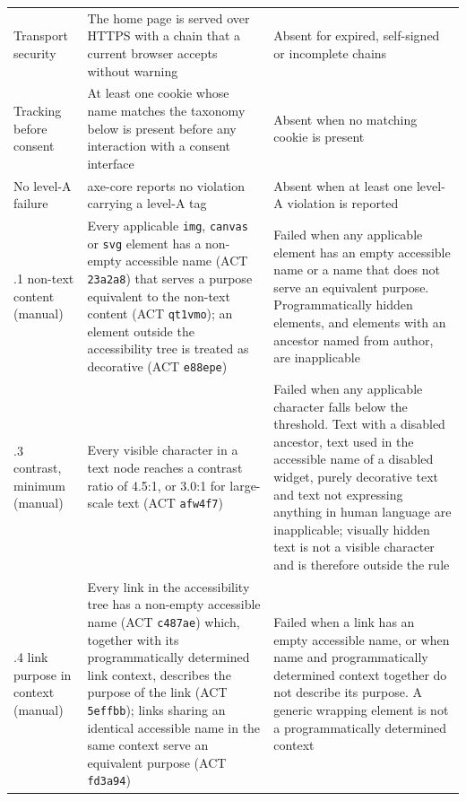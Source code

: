 \documentclass[]{interact}
\begin{document}
\begin{longtable}{@{}>{\RaggedRight}p{2.7cm}>{\RaggedRight}p{4.75cm}>{\RaggedRight\arraybackslash}p{4.55cm}@{}}
	\addlinespace
	Transport security & The home page is served over HTTPS with a chain that a current browser accepts without warning & Absent for expired, self-signed or incomplete chains \\
	\addlinespace
	Tracking before consent & At least one cookie whose name matches the taxonomy below is present before any interaction with a consent interface & Absent when no matching cookie is present \\
	\addlinespace
	No level-A failure & axe-core reports no violation carrying a level-A tag & Absent when at least one level-A violation is reported \\
	\addlinespace
	1.1.1 non-text content (manual) & Every applicable \verb|img|, \verb|canvas| or \verb|svg| element has a non-empty accessible name (ACT \texttt{23a2a8}) that serves a purpose equivalent to the non-text content (ACT \texttt{qt1vmo}); an element outside the accessibility tree is treated as decorative (ACT \texttt{e88epe}) & Failed when any applicable element has an empty accessible name or a name that does not serve an equivalent purpose. Programmatically hidden elements, and elements with an ancestor named from author, are inapplicable \\
	\addlinespace
	1.4.3 contrast, minimum (manual) & Every visible character in a text node reaches a contrast ratio of 4.5:1, or 3.0:1 for large-scale text (ACT \texttt{afw4f7}) & Failed when any applicable character falls below the threshold. Text with a disabled ancestor, text used in the accessible name of a disabled widget, purely decorative text and text not expressing anything in human language are inapplicable; visually hidden text is not a visible character and is therefore outside the rule \\
	\addlinespace
	2.4.4 link purpose in context (manual) & Every link in the accessibility tree has a non-empty accessible name (ACT \texttt{c487ae}) which, together with its programmatically determined link context, describes the purpose of the link (ACT \texttt{5effbb}); links sharing an identical accessible name in the same context serve an equivalent purpose (ACT \texttt{fd3a94}) & Failed when a link has an empty accessible name, or when name and programmatically determined context together do not describe its purpose. A generic wrapping element is not a programmatically determined context \\
\end{longtable}
\normalsize
\end{document}

